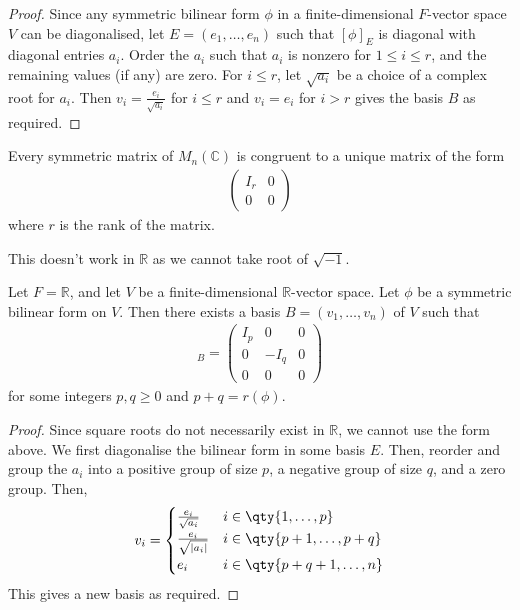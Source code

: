 \begin{proof}
	Since any symmetric bilinear form $\phi$ in a finite-dimensional $F$-vector space $V$ can be diagonalised, let $E = (e_1, \dots, e_n)$ such that $[\phi]_E$ is diagonal with diagonal entries $a_i$.
	Order the $a_i$ such that $a_i$ is nonzero for $1 \leq i \leq r$, and the remaining values (if any) are zero.
	For $i \leq r$, let $\sqrt{a_i}$ be a choice of a complex root for $a_i$.
	Then $v_i = \frac{e_i}{\sqrt{a_i}}$ for $i \leq r$ and $v_i = e_i$ for $i > r$ gives the basis $B$ as required.
\end{proof}

\begin{corollary}
	Every symmetric matrix of $M_n(\mathbb C)$ is congruent to a unique matrix of the form
	\begin{align*}
		\begin{pmatrix}
			I_r & 0 \\
			0   & 0
		\end{pmatrix}
	\end{align*}
	where $r$ is the rank of the matrix.
\end{corollary}

This doesn't work in $\mathbb{R}$ as we cannot take root of $\sqrt{-1}$.
\begin{corollary}
	Let $F = \mathbb R$, and let $V$ be a finite-dimensional $\mathbb R$-vector space.
	Let $\phi$ be a symmetric bilinear form on $V$.
	Then there exists a basis $B = (v_1, \dots, v_n)$ of $V$ such that
	\begin{align*}
		[\phi]_B = \begin{pmatrix}
			I_p & 0    & 0 \\
			0   & -I_q & 0 \\
			0   & 0    & 0
		\end{pmatrix}
	\end{align*}
	for some integers $p, q \geq 0$ and $p + q = r(\phi)$.
\end{corollary}

\begin{proof}
	Since square roots do not necessarily exist in $\mathbb R$, we cannot use the form above.
	We first diagonalise the bilinear form in some basis $E$.
	Then, reorder and group the $a_i$ into a positive group of size $p$, a negative group of size $q$, and a zero group.
	Then,
	\begin{align*}
		v_i = \begin{cases}
			\frac{e_i}{\sqrt{a_i}}  & i \in \qty{1, \dots, p}     \\
			\frac{e_i}{\sqrt{|a_i|}} & i \in \qty{p+1, \dots, p+q} \\
			e_i                     & i \in \qty{p+q+1, \dots, n}
		\end{cases}
	\end{align*}
	This gives a new basis as required.
\end{proof}

